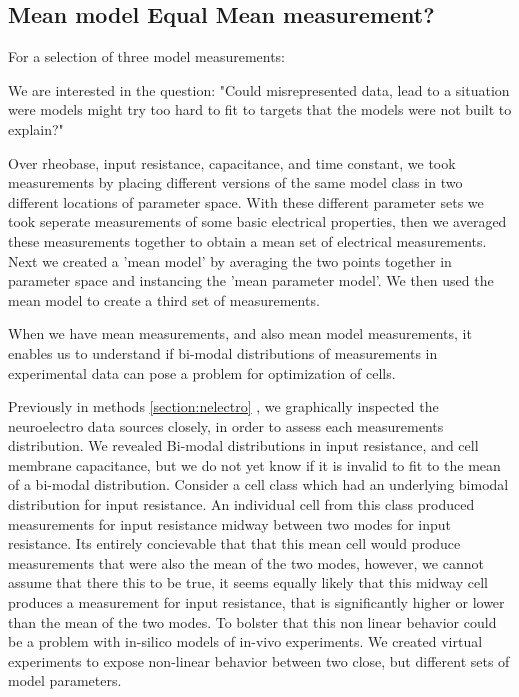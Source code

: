 \subsection{Mean model Equal Mean measurement?}
For a selection of three model measurements:

We are interested in the question: "Could misrepresented data, lead to a situation were models might try too hard to fit to targets that the models were not built to explain?" %

Over rheobase, input resistance, capacitance, and time constant, we took measurements by placing different versions of the same  model class in  two different locations of parameter space. With these different parameter sets we took seperate measurements of some basic electrical properties, then we averaged these measurements together to obtain a mean set of electrical measurements. Next we created a 'mean model' by averaging the two points together in parameter space and instancing the 'mean parameter model'. We then used the mean model to create a third set of measurements.

When we have mean measurements, and also mean model measurements, it enables us to understand if bi-modal distributions of measurements in experimental data can pose a problem for optimization of cells.

Previously in methods \ref{section:nelectro} , we graphically inspected the neuroelectro data sources closely, in order to assess each measurements distribution. We revealed Bi-modal distributions in input resistance, and cell membrane capacitance, but we do not yet know if it is invalid to fit to the mean of a bi-modal distribution. Consider a  cell class which had an underlying bimodal distribution for input resistance. An individual cell from this class produced measurements for input resistance midway between two modes for input resistance. Its entirely concievable that that this mean cell would produce measurements that were also the mean of the two modes, however, we cannot assume that there this to be true, it seems equally likely that this midway cell produces a measurement for input resistance, that is significantly higher or lower than the mean of the two modes. To bolster that this non linear behavior could be a problem with in-silico models of in-vivo experiments. We created virtual experiments to expose non-linear behavior between two  close, but different sets of model parameters.


